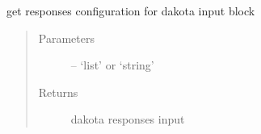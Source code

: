 \documentclass[letterpaper,10pt,english]{sphinxmanual}
\begin{document}
\begin{fulllineitems}
\begin{fulllineitems}
\label{\detokenize{src/apidocs/genopt:genopt.DakotaEnviron.get_config}}
get responses configuration for dakota input block
\begin{quote}\begin{description}
\item[{Parameters}] \leavevmode
{} -- `list' or `string'

\item[{Returns}] \leavevmode
dakota responses input

\end{description}\end{quote}

\end{fulllineitems}


\end{fulllineitems}

\end{document}
